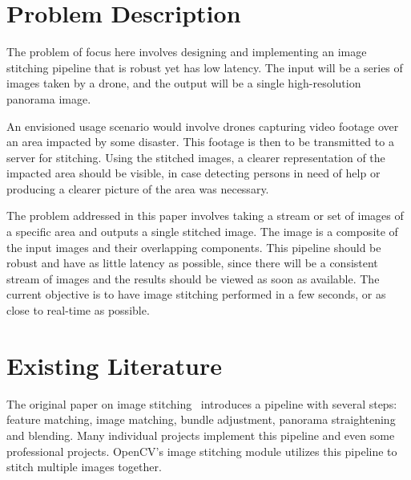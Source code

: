 \documentclass[12pt, a4paper]{article}
\begin{document}
\section{Problem Description}
\label{sec:ProblemDescription}
The problem of focus here involves designing and implementing an image stitching 
pipeline that is robust yet has low latency. The input will be a series of images
taken by a drone, and the output will be a single high-resolution panorama image.

An envisioned usage scenario would involve drones capturing video footage 
over an area impacted by some disaster. This footage is then to be transmitted 
to a server for stitching. Using the stitched images, a clearer representation of the 
impacted area should be visible, in case detecting persons in need of help or
producing a clearer picture of the area was necessary. 

The problem addressed in this paper involves taking a stream or set of images
of a specific area and outputs a single stitched image. The image is a composite
of the input images and their overlapping components. This pipeline should be 
robust and have as little latency as possible, since there will be a consistent
stream of images and the results should be viewed as soon as available. The current
objective is to have image stitching performed in a few seconds, or as close to 
real-time as possible.

\section{Existing Literature}
\label{sec:Literature}

The original paper on image stitching~\cite{brown2007automatic} introduces a 
pipeline with several steps: feature matching, image matching, bundle adjustment,
panorama straightening and blending. Many individual projects implement this 
pipeline and even some professional projects. OpenCV's image stitching module
utilizes this pipeline to stitch multiple images together.
\end{document}
